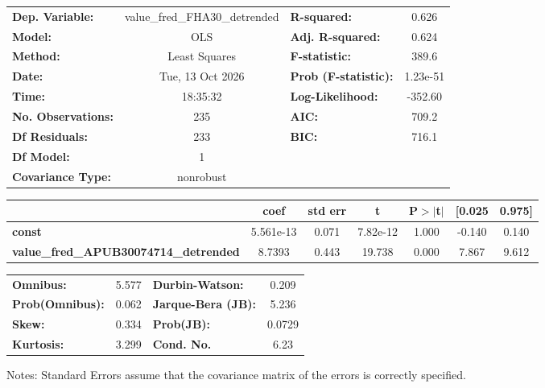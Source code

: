 \begin{center}
\begin{tabular}{lclc}
\toprule
\textbf{Dep. Variable:}                       & value\_fred\_FHA30\_detrended & \textbf{  R-squared:         } &     0.626   \\
\textbf{Model:}                               &              OLS              & \textbf{  Adj. R-squared:    } &     0.624   \\
\textbf{Method:}                              &         Least Squares         & \textbf{  F-statistic:       } &     389.6   \\
\textbf{Date:}                                &        Tue, 13 Oct 2026       & \textbf{  Prob (F-statistic):} &  1.23e-51   \\
\textbf{Time:}                                &            18:35:32           & \textbf{  Log-Likelihood:    } &   -352.60   \\
\textbf{No. Observations:}                    &                235            & \textbf{  AIC:               } &     709.2   \\
\textbf{Df Residuals:}                        &                233            & \textbf{  BIC:               } &     716.1   \\
\textbf{Df Model:}                            &                  1            & \textbf{                     } &             \\
\textbf{Covariance Type:}                     &           nonrobust           & \textbf{                     } &             \\
\bottomrule
\end{tabular}
\begin{tabular}{lcccccc}
                                              & \textbf{coef} & \textbf{std err} & \textbf{t} & \textbf{P$> |$t$|$} & \textbf{[0.025} & \textbf{0.975]}  \\
\midrule
\textbf{const}                                &    5.561e-13  &        0.071     &  7.82e-12  &         1.000        &       -0.140    &        0.140     \\
\textbf{value\_fred\_APUB30074714\_detrended} &       8.7393  &        0.443     &    19.738  &         0.000        &        7.867    &        9.612     \\
\bottomrule
\end{tabular}
\begin{tabular}{lclc}
\textbf{Omnibus:}       &  5.577 & \textbf{  Durbin-Watson:     } &    0.209  \\
\textbf{Prob(Omnibus):} &  0.062 & \textbf{  Jarque-Bera (JB):  } &    5.236  \\
\textbf{Skew:}          &  0.334 & \textbf{  Prob(JB):          } &   0.0729  \\
\textbf{Kurtosis:}      &  3.299 & \textbf{  Cond. No.          } &     6.23  \\
\bottomrule
\end{tabular}
\end{center}

Notes: \newline
 [1] Standard Errors assume that the covariance matrix of the errors is correctly specified.